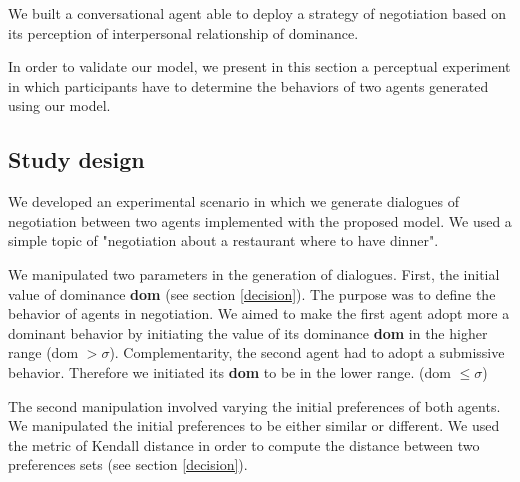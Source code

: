 \documentclass{llncs}
\begin{document}
	 We built a conversational agent able to deploy a strategy of negotiation based on its perception of interpersonal relationship of dominance. 
	 
	 
	 In order to validate our model, we present in this section a perceptual experiment in which participants have to determine the behaviors of two agents generated using our model. 
	 
		\subsection{Study design}
	We developed an experimental scenario in which we generate dialogues of negotiation between two agents implemented with the proposed model. We used a simple topic of "negotiation about a restaurant where to have dinner".
	
	We manipulated two parameters in the generation of dialogues. First, the initial value of dominance \textbf{dom} (see section \ref{decision}). The purpose was to define the behavior of agents in negotiation. 
	We aimed to make the first agent adopt more a dominant behavior by initiating the value of its dominance \textbf{dom} in the higher range (dom  $>\sigma$). Complementarity, the second agent had to adopt a submissive behavior. Therefore we initiated its \textbf{dom} to be in the lower range. (dom  $ \leq \sigma$)
	
	The second manipulation involved varying the initial preferences of both agents.  We manipulated the initial preferences to be either similar or different. We used the metric of Kendall distance \cite{bra2013Kendall} in order to compute the distance between two preferences sets (see section \ref{decision}).  
			
\end{document}

